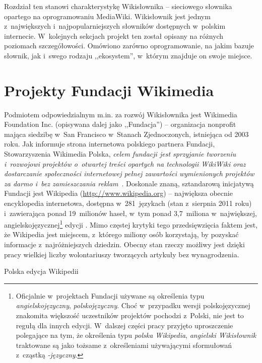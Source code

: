 \label{chap:wikt}
Rozdział ten stanowi charakterystykę Wikisłownika -- sieciowego słownika opartego na oprogramowaniu MediaWiki. Wikisłownik jest jednym z~największych i~najpopularniejszych słowników dostępnych w~polskim internecie. W~kolejnych sekcjach projekt ten został opisany na różnych poziomach szczegółowości. Omówiono zarówno oprogramowanie, na jakim bazuje słownik, jak i~swego rodzaju ,,ekosystem'', w~którym znajduje on swoje miejsce.

\section{Projekty Fundacji Wikimedia}
Podmiotem odpowiedzialnym m.in. za rozwój Wikisłownika jest Wikimedia Foundation Inc. (opisywana dalej jako ,,Fundacja'') -- organizacja non\dywiz{}profit mająca siedzibę w~San Francisco w~Stanach Zjednoczonych, istniejąca od 2003 roku. Jak informuje strona internetowa polskiego partnera Fundacji, Stowarzyszenia Wikimedia Polska, \emph{celem fundacji jest sprzyjanie tworzeniu i~rozwojowi projektów o~otwartej treści opartych na technologii WikiWiki oraz dostarczanie społeczności internetowej pełnej zawartości wymienionych projektów za darmo i~bez zamieszczania reklam}~\cite{wm:pl}. Doskonale znaną, sztandarową inicjatywą Fundacji jest Wikipedia (\url{http://www.wikipedia.org}) -- największa obecnie encyklopedia internetowa, dostępna w~281~językach (stan z~sierpnia 2011 roku) i~zawierająca ponad 19~milionów haseł, w~tym ponad 3,7~miliona w~największej, angielskojęzycznej\footnote{Oficjalnie w~projektach Fundacji używane są określenia typu \emph{angielskojęzyczny}, \emph{polskojęzyczny}. Choć w~przypadku wersji polskojęzycznej znakomita większość uczestników projektów pochodzi z~Polski, nie jest to regułą dla innych edycji. W~dalszej części pracy przyjęto uproszczenie polegające na tym, że określenia typu \emph{polska Wikipedia}, \emph{angielski Wikisłownik} traktowane są jako tożsame z~określeniami używającymi sformułowań z~cząstką \emph{-języczny}.} edycji \cite{wiki:list}. Mimo częstej krytyki tego przedsięwzięcia faktem jest, że Wikipedia jest miejscem, z~którego miliony osób korzystają, by pozyskać informacje z~najróżniejszych dziedzin. Obecny stan rzeczy możliwy jest dzięki pracy wielkiej liczby wolontariuszy tworzących artykuły bez wynagrodzenia.

\begin{illustration}
	\caption{Polska edycja Wikipedii}
\end{illustration}

